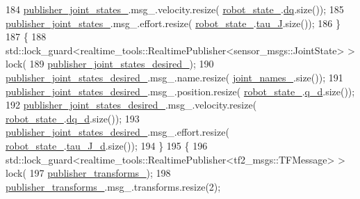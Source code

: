 \begin{DoxyCode}
184     \hyperlink{classfranka__control_1_1FrankaStateController_a9cc0cb3e247d25ef305170666b48ec72}{publisher\_joint\_states\_}.msg\_.velocity.resize(
      \hyperlink{classfranka__control_1_1FrankaStateController_a0d097abb2665aadbc8d38662bba5ae8b}{robot\_state\_}.\hyperlink{structfranka_1_1RobotState_af372a0081d72bc7b4fe873f99c7b2d8c}{dq}.size());
185     \hyperlink{classfranka__control_1_1FrankaStateController_a9cc0cb3e247d25ef305170666b48ec72}{publisher\_joint\_states\_}.msg\_.effort.resize(
      \hyperlink{classfranka__control_1_1FrankaStateController_a0d097abb2665aadbc8d38662bba5ae8b}{robot\_state\_}.\hyperlink{structfranka_1_1RobotState_ad90e2518d661da0d8fa4c864bae210e5}{tau\_J}.size());
186   \}
187   \{
188     std::lock\_guard<realtime\_tools::RealtimePublisher<sensor\_msgs::JointState> > lock(
189         \hyperlink{classfranka__control_1_1FrankaStateController_aff239ebea490b911ac660c5b79f6308d}{publisher\_joint\_states\_desired\_});
190     \hyperlink{classfranka__control_1_1FrankaStateController_aff239ebea490b911ac660c5b79f6308d}{publisher\_joint\_states\_desired\_}.msg\_.name.resize(
      \hyperlink{classfranka__control_1_1FrankaStateController_afb6dc481c4d282d5f8f830f0cf943404}{joint\_names\_}.size());
191     \hyperlink{classfranka__control_1_1FrankaStateController_aff239ebea490b911ac660c5b79f6308d}{publisher\_joint\_states\_desired\_}.msg\_.position.resize(
      \hyperlink{classfranka__control_1_1FrankaStateController_a0d097abb2665aadbc8d38662bba5ae8b}{robot\_state\_}.\hyperlink{structfranka_1_1RobotState_a706045af1b176049e9e56df755325bd2}{q\_d}.size());
192     \hyperlink{classfranka__control_1_1FrankaStateController_aff239ebea490b911ac660c5b79f6308d}{publisher\_joint\_states\_desired\_}.msg\_.velocity.resize(
      \hyperlink{classfranka__control_1_1FrankaStateController_a0d097abb2665aadbc8d38662bba5ae8b}{robot\_state\_}.\hyperlink{structfranka_1_1RobotState_aed294a088be27b927be9575a18bec949}{dq\_d}.size());
193     \hyperlink{classfranka__control_1_1FrankaStateController_aff239ebea490b911ac660c5b79f6308d}{publisher\_joint\_states\_desired\_}.msg\_.effort.resize(
      \hyperlink{classfranka__control_1_1FrankaStateController_a0d097abb2665aadbc8d38662bba5ae8b}{robot\_state\_}.\hyperlink{structfranka_1_1RobotState_a7086a89a2705810f93a3a95d43df2d9d}{tau\_J\_d}.size());
194   \}
195   \{
196     std::lock\_guard<realtime\_tools::RealtimePublisher<tf2\_msgs::TFMessage> > lock(
197         \hyperlink{classfranka__control_1_1FrankaStateController_a3466cae3276a7576686661ecbe05a649}{publisher\_transforms\_});
198     \hyperlink{classfranka__control_1_1FrankaStateController_a3466cae3276a7576686661ecbe05a649}{publisher\_transforms\_}.msg\_.transforms.resize(2);

\end{DoxyCode}
